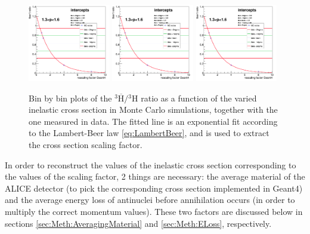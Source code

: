 \begin{figure}
    \centering
    \includegraphics[width=0.32\textwidth]{figures/triton/tbar_Fit_Bin1.png}
    \includegraphics[width=0.32\textwidth]{figures/triton/tbar_Fit_Bin1.png}
    \includegraphics[width=0.32\textwidth]{figures/triton/tbar_Fit_Bin1.png}
    \caption{Bin by bin plots of the $^3\overline{\mathrm{H}}/{^3\mathrm{H}}$ ratio as a function of the varied inelastic cross section in Monte Carlo simulations, together with the one measured in data. The fitted line is an exponential fit according to the Lambert-Beer law \ref{eq:LambertBeer}, and is used to extract the cross section scaling factor.}
    \label{fig:Meth:RatiosAsFunctionsOfSigmaInel3H}
\end{figure}

In order to reconstruct the values of the inelastic cross section corresponding to the values of the scaling factor, 2 things are necessary: the average material of the ALICE detector (to pick the corresponding cross section implemented in Geant4) and the average energy loss of antinuclei before annihilation occurs (in order to multiply the correct momentum values). These two factors are discussed below in sections \ref{sec:Meth:AveragingMaterial} and \ref{sec:Meth:ELoss}, respectively.\\


